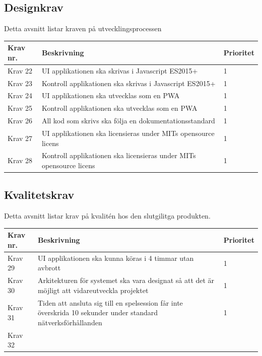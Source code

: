 \documentclass[10pt]{article}
\begin{document}
	\subsection{Designkrav}
	Detta avsnitt listar kraven på utvecklingsprocessen
	
	\begin{tabular}{| p{2cm} | p{8cm} | p{2cm}|}
		\hline
		\textbf{Krav nr.} & \textbf{Beskrivning} & \textbf{Prioritet} \\ \hline
		
		Krav 22 & UI applikationen ska skrivas i Javascript ES2015+ & 1 \\ \hline
		Krav 23 & Kontroll applikationen ska skrivas i Javascript ES2015+ & 1 \\ \hline
		Krav 24 & UI applikationen ska utvecklas som en PWA & 1 \\ \hline
		Krav 25 & Kontroll applikationen ska utvecklas som en PWA & 1 \\ \hline
		Krav 26 & All kod som skrivs ska följa en dokumentationsstandard & 1 \\ \hline
		Krav 27 & UI applikationen ska licensieras under MITs opensource licens & 1 \\ \hline
		Krav 28 & Kontroll applikationen ska licensieras under MITs opensource licens & 1 \\ \hline
	\end{tabular}

	\subsection{Kvalitetskrav}
	Detta avsnitt listar krav på kvalitén hos den slutgilitga produkten.
	
		\begin{tabular}{|p{2cm}|p{8cm}|p{2cm}|}
		\hline
		\textbf{Krav nr.} & \textbf{Beskrivning} & \textbf{Prioritet} \\ \hline
		Krav 29 & UI applikationen ska kunna köras i 4 timmar utan avbrott & 1 \\ \hline
		Krav 30 & Arkitekturen för systemet ska vara designat så att det är möjligt att vidareutveckla projektet & 1 \\ \hline
		Krav 31 & Tiden att ansluta sig till en spelsession får inte överskrida 10 sekunder under standard nätverksförhållanden & 1 \\ \hline
		Krav 32 & & \\ \hline
		
	\end{tabular}
\end{document}
